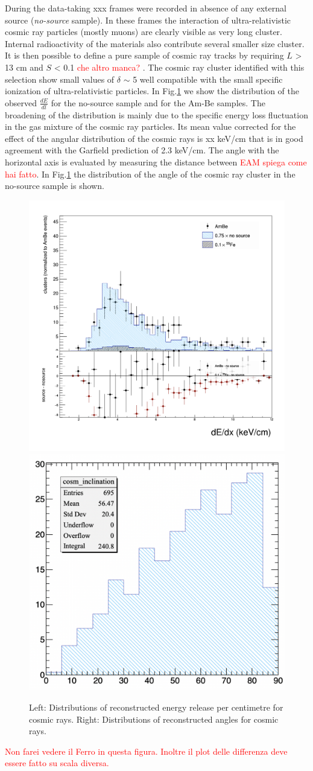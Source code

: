 \documentclass[12pt]{iopart}
\begin{document}
 During the data-taking xxx frames were recorded in absence of any external source ({\it no-source} sample). In these frames the interaction of ultra-relativistic cosmic ray particles (mostly muons) are clearly visible  as  very long cluster. Internal radioactivity of the \lemon materials  also contribute several smaller size cluster.  It is then possible to define a pure sample of cosmic ray tracks by requiring $L$ > 13 cm and $S$ < 0.1  \textcolor{red}{che altro manca? }. The cosmic ray cluster identified with this selection show small values of  $\delta$ $\sim $ 5 well compatible with the small specific ionization of ultra-relativistic particles. 
 In Fig.\ref{fig:cosmics} we show the distribution of the observed $\frac{dE}{dl}$ for the no-source sample and for the Am-Be samples. The broadening of the distribution is mainly due to the specific energy loss fluctuation in the gas mixture of the cosmic ray particles.   Its mean value corrected for the effect of the angular distribution of the cosmic rays is   xx keV/cm that is in good agreement with the Garfield prediction of 2.3 keV/cm.  The angle with the horizontal axis is evaluated by  measuring the distance between \textcolor{red}{EAM spiega come hai fatto}. In Fig.\ref{fig:cosmics} the distribution   of the  angle of the cosmic ray cluster in the no-source sample is shown.
 
 
 \begin{figure}[ht]
	\centering
	\includegraphics[width=0.45\linewidth]{dEdx_cosmics.png}
	\includegraphics[width=0.45\linewidth]{cosmic_angle.png}
  	\caption{Left: Distributions of reconstructed energy release per centimetre for cosmic rays. Right: Distributions of reconstructed angles for cosmic rays. }
  	\label{fig:cosmics}
\end{figure}
\textcolor{red}{Non farei vedere il Ferro in questa figura. Inoltre il plot delle differenza deve essere fatto su scala diversa. }
\end{document}
